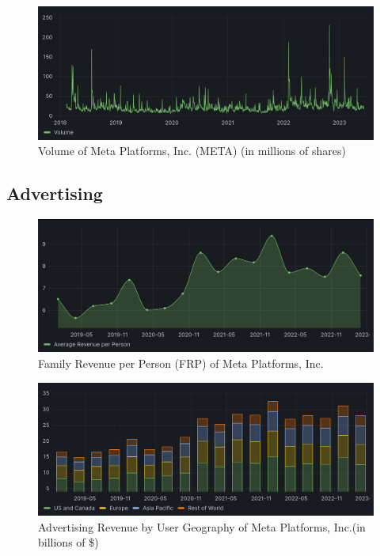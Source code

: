 \documentclass[12pt, a4paper]{article}
\begin{document}
\begin{figure}[H]
    \centering
    \includegraphics[width=1.00\textwidth]{volume}
    \caption{Volume of Meta Platforms, Inc. (META) (in millions of
    shares)\cite{stockPrice}}
    \label{fig:volume}
\end{figure}

\subsection*{Advertising}

\begin{figure}[H]
    \centering
    \includegraphics[width=1.00\textwidth]{family-revenue-per-person}
    \caption{Family Revenue per Person (FRP) of Meta Platforms,
    Inc.\cite{2023q1,2021q2Slides,2019q4Slides}}
    \label{fig:family-revenue-per-person}
\end{figure}

\begin{figure}[H]
    \centering
    \includegraphics[width=1.00\textwidth]{advertising-revenue-by-user-geography}
    \caption{Advertising Revenue by User Geography of Meta Platforms, Inc.(in
    billions of \$)\cite{2023q1,2021q2Slides,2019q4Slides}}
    \label{fig:advertising-revenue-by-user-geography}
\end{figure}
\end{document}
